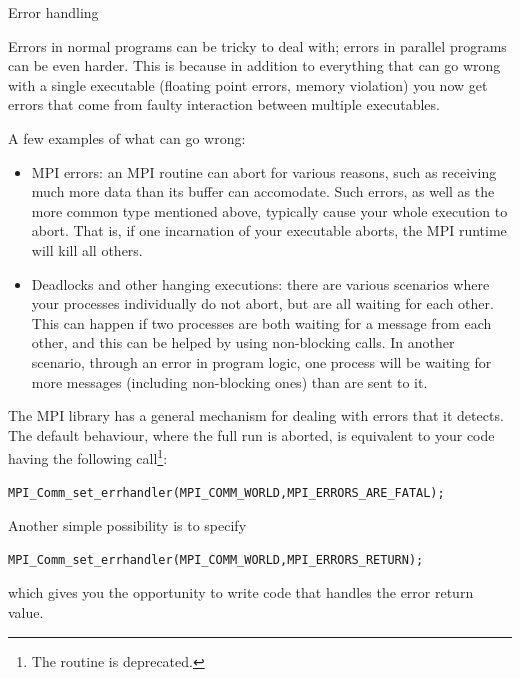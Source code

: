 
 {Error handling}

Errors in normal programs can be tricky to deal with; errors in
parallel programs can be even harder. This is because in addition to
everything that can go wrong with a single executable (floating point
errors, memory violation) you now get errors that come from faulty
interaction between multiple executables.

A few examples of what can go wrong:
\begin{itemize}
\item MPI errors: an MPI routine can abort for various reasons, such
  as receiving much more data than its buffer can accomodate. Such
  errors, as well as the more common type mentioned above, typically
  cause your whole execution to abort. That is, if one incarnation of
  your executable aborts, the MPI runtime will kill all others.
\item Deadlocks and other hanging executions: there are various
  scenarios where your processes individually do not abort, but are all
  waiting for each other. This can happen if two processes are both
  waiting for a message from each other, and this can be helped by
  using non-blocking calls. In another scenario, through an error in
  program logic, one process will be waiting for more messages
  (including non-blocking ones) than are sent to it.
\end{itemize}

The MPI library has a general mechanism for dealing with errors that
it detects. The default behaviour, where the full run is aborted, is
equivalent to your code having the following
call\footnote{The routine
   is deprecated.}:
\begin{verbatim}
MPI_Comm_set_errhandler(MPI_COMM_WORLD,MPI_ERRORS_ARE_FATAL);
\end{verbatim}
Another simple possibility is to specify
\begin{verbatim}
MPI_Comm_set_errhandler(MPI_COMM_WORLD,MPI_ERRORS_RETURN);
\end{verbatim}
which gives you the opportunity to write code that handles the error
return value.

